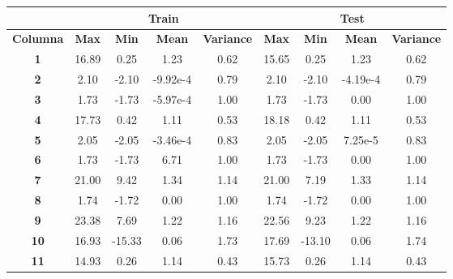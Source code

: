 \begin{table}[H]
    \begin{tabular}{c|c|c|c|c||c|c|c|c|}
    \cline{2-9}
    \textbf{}                        & \multicolumn{4}{c||}{\textbf{Train}}                       & \multicolumn{4}{c|}{\textbf{Test}}                              \\ \hline
    \multicolumn{1}{|c|}{\textbf{Columna}} & \textbf{Max} & \textbf{Min} & \textbf{Mean} & \textbf{Variance} & \textbf{Max} & \textbf{Min} & \textbf{Mean} & \textbf{Variance} \\ \hline
    \multicolumn{1}{|c|}{\textbf{1}}          & 16.89  & 0.25   & 1.23    & 0.62        & 15.65  & 0.25   & 1.23    & 0.62              \\ \hline
    \multicolumn{1}{|c|}{\textbf{2}}          & 2.10   & -2.10  & -9.92e-4      & 0.79        & 2.10   & -2.10  & -4.19e-4      & 0.79              \\ \hline
    \multicolumn{1}{|c|}{\textbf{3}}          & 1.73   & -1.73  & -5.97e-4      & 1.00        & 1.73   & -1.73  & 0.00    & 1.00              \\ \hline
    \multicolumn{1}{|c|}{\textbf{4}}          & 17.73  & 0.42   & 1.11    & 0.53        & 18.18  & 0.42   & 1.11    & 0.53              \\ \hline
    \multicolumn{1}{|c|}{\textbf{5}}          & 2.05   & -2.05  & -3.46e-4      & 0.83        & 2.05   & -2.05  & 7.25e-5       & 0.83              \\ \hline
    \multicolumn{1}{|c|}{\textbf{6}}          & 1.73   & -1.73  & 6.71    & 1.00        & 1.73   & -1.73  & 0.00    & 1.00              \\ \hline
    \multicolumn{1}{|c|}{\textbf{7}}          & 21.00  & 9.42   & 1.34    & 1.14        & 21.00  & 7.19   & 1.33    & 1.14              \\ \hline
    \multicolumn{1}{|c|}{\textbf{8}}          & 1.74   & -1.72  & 0.00    & 1.00        & 1.74   & -1.72  & 0.00    & 1.00              \\ \hline
    \multicolumn{1}{|c|}{\textbf{9}}          & 23.38  & 7.69   & 1.22    & 1.16        & 22.56  & 9.23   & 1.22    & 1.16              \\ \hline
    \multicolumn{1}{|c|}{\textbf{10}}         & 16.93  & -15.33       & 0.06    & 1.73        & 17.69  & -13.10       & 0.06    & 1.74              \\ \hline
    \multicolumn{1}{|c|}{\textbf{11}}         & 14.93  & 0.26   & 1.14    & 0.43        & 15.73  & 0.26   & 1.14    & 0.43              \\ \hline

\end{tabular}
\end{table}
